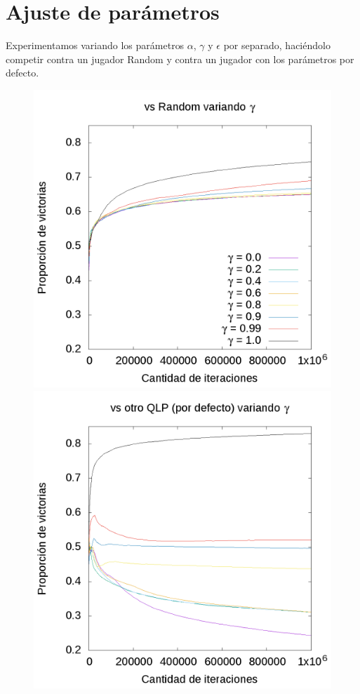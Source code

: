 \documentclass[10pt, a4paper]{article}
\begin{document}
\section{Ajuste de parámetros}

Experimentamos variando los parámetros $\alpha$, $\gamma$ y $\epsilon$ por separado, haciéndolo competir contra un jugador Random y contra un jugador con los parámetros por defecto.

\begin{figure}[ht]
 \centering
  \begin{minipage}[c]{1\textwidth}
	\includegraphics[scale=0.32]{GammaR.png}
	\includegraphics[scale=0.32]{GammaQ.png}
  \end{minipage}
\end{figure}
\end{document}

